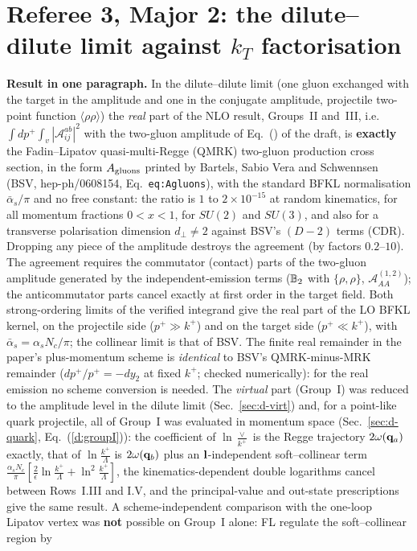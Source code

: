 \providecommand{\dref}[1]{\texttt{\detokenize{#1}}}
\section{Referee 3, Major 2: the dilute--dilute limit against $k_T$ factorisation}\label{sec:ref3dilute}

\noindent\textbf{Result in one paragraph.} In the dilute--dilute limit (one gluon exchanged with the target in the amplitude and one in the conjugate amplitude, projectile two-point function $\langle\rho\rho\rangle$) the \emph{real} part of the NLO result, Groups~II and~III, i.e.\ $\int dp^+\!\int_v|\mathcal A^{ab}_{ij}|^2$ with the two-gluon amplitude of Eq.~(\dref{eq:A2gamp}) of the draft, is \textbf{exactly} the Fadin--Lipatov quasi-multi-Regge (QMRK) two-gluon production cross section, in the form $A_{\rm gluons}$ printed by Bartels, Sabio Vera and Schwennsen (BSV, hep-ph/0608154, Eq.~\texttt{eq:Agluons}), with the standard BFKL normalisation $\bar\alpha_s/\pi$ and no free constant: the ratio is $1$ to $2\times10^{-15}$ at random kinematics, for all momentum fractions $0<x<1$, for $SU(2)$ and $SU(3)$, and also for a transverse polarisation dimension $d_\perp\neq2$ against BSV's $(D-2)$ terms (CDR). Dropping any piece of the amplitude destroys the agreement (by factors $0.2$--$10$). The agreement requires the commutator (contact) parts of the two-gluon amplitude generated by the independent-emission terms ($\mathbb{B}_2$ with $\{\rho,\rho\}$, $\mathcal A^{(1,2)}_{AA}$); the anticommutator parts cancel exactly at first order in the target field. Both strong-ordering limits of the verified integrand give the real part of the LO BFKL kernel, on the projectile side ($p^+\gg k^+$) and on the target side ($p^+\ll k^+$), with $\bar\alpha_s=\alpha_sN_c/\pi$; the collinear limit is that of BSV. The finite real remainder in the paper's plus-momentum scheme is \emph{identical} to BSV's QMRK-minus-MRK remainder ($dp^+/p^+=-dy_2$ at fixed $k^+$; checked numerically): for the real emission no scheme conversion is needed. The \emph{virtual} part (Group~I) was reduced to the amplitude level in the dilute limit (Sec.~\ref{sec:d-virt}) and, for a point-like quark projectile, all of Group~I was evaluated in momentum space (Sec.~\ref{sec:d-quark}, Eq.~(\ref{d:groupI})): the coefficient of $\ln\frac{\vee}{k^+}$ is the Regge trajectory $2\omega(\mathbf{q}_a)$ exactly, that of $\ln\frac{k^+}{\Lambda}$ is $2\omega(\mathbf{q}_b)$ plus an $\mathbf{l}$-independent soft--collinear term $\frac{\alpha_sN_c}{\pi}[\frac2\epsilon\ln\frac{k^+}\Lambda+\ln^2\frac{k^+}\Lambda]$, the kinematics-dependent double logarithms cancel between Rows~I.III and I.V, and the principal-value and out-state prescriptions give the same result. A scheme-independent comparison with the one-loop Lipatov vertex was \textbf{not} possible on Group~I alone: FL regulate the soft--collinear region by 